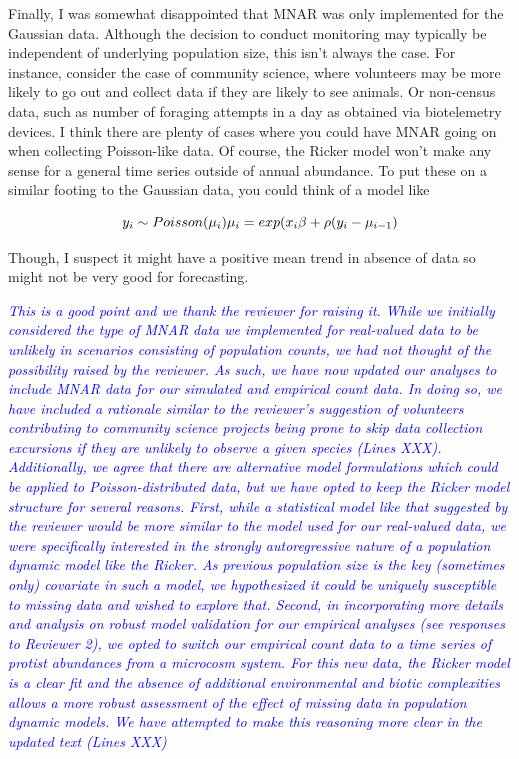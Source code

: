 \documentclass{article}
\begin{document}
\begin{linenumbers}
\bigskip

\noindent Finally, I was somewhat disappointed that MNAR was only implemented for the Gaussian data. Although the decision to conduct monitoring may typically be independent of underlying population size, this isn’t always the case. For instance, consider the case of community science, where volunteers may be more likely to go out and collect data if they are likely to see animals. Or non-census data, such as number of foraging attempts in a day as obtained via biotelemetry devices. I think there are plenty of cases where you could have MNAR going on when collecting Poisson-like data. Of course, the Ricker model won’t make any sense for a general time series outside of annual abundance. To put these on a similar footing to the Gaussian data, you could think of a model like

\begin{center}
\begin{subequations}
    y_i \sim Poisson(\mu_i) \\
    \mu_i = exp(x_i \beta + \rho(y_i-\mu_{i-1})
\end{subequations}
\end{center}

\noindent Though, I suspect it might have a positive mean trend in absence of data so might not be very good for forecasting.

\noindent \textcolor{blue}{\textit{This is a good point and we thank the reviewer for raising it. While we initially considered the type of MNAR data we implemented for real-valued data to be unlikely in scenarios consisting of population counts, we had not thought of the possibility raised by the reviewer. As such, we have now updated our analyses to include MNAR data for our simulated and empirical count data. In doing so, we have included a rationale similar to the reviewer's suggestion of volunteers contributing to community science projects being prone to skip data collection excursions if they are unlikely to observe a given species (Lines XXX). Additionally, we agree that there are alternative model formulations which could be applied to Poisson-distributed data, but we have opted to keep the Ricker model structure for several reasons. First, while a statistical model like that suggested by the reviewer would be more similar to the model used for our real-valued data, we were specifically interested in the strongly autoregressive nature of a population dynamic model like the Ricker. As previous population size is the key (sometimes only) covariate in such a model, we hypothesized it could be uniquely susceptible to missing data and wished to explore that. Second, in incorporating more details and analysis on robust model validation for our empirical analyses (see responses to Reviewer 2), we opted to switch our empirical count data to a time series of protist abundances from a microcosm system. For this new data, the Ricker model is a clear fit and the absence of additional environmental and biotic complexities allows a more robust assessment of the effect of missing data in population dynamic models. We have attempted to make this reasoning more clear in the updated text (Lines XXX)}}


\end{linenumbers}
\end{document}
